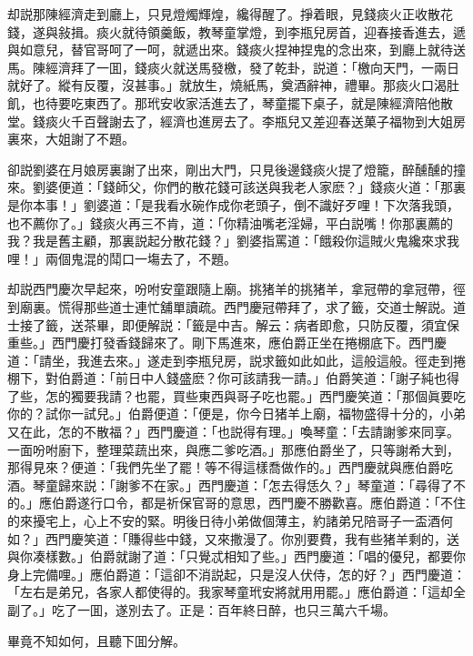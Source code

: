 却説那陳經濟走到廳上，只見燈燭輝煌，纔得醒了。掙着眼，見錢痰火正收散花錢，遂與敍揖。痰火就待領羹飯，教琴童掌燈，到李瓶兒房首，迎春接香進去，遞與如意兒，替官哥呵了一呵，就遞出來。錢痰火捏神捏鬼的念出來，到廳上就待送馬。陳經濟拜了一囬，錢痰火就送馬發檄，發了乾卦，説道：「檄向天門，一兩日就好了。縱有反覆，沒甚事。」就放生，燒紙馬，奠酒辭神，禮畢。那痰火口渴肚飢，也待要吃東西了。那玳安收家活進去了，琴童擺下桌子，就是陳經濟陪他散堂。錢痰火千百聲謝去了，經濟也進房去了。李瓶兒又差迎春送菓子福物到大姐房裏來，大姐謝了不題。

卻説劉婆在月娘房裏謝了出來，剛出大門，只見後邊錢痰火提了燈籠，醉醺醺的撞來。劉婆便道：「錢師父，你們的散花錢可該送與我老人家麽？」錢痰火道：「那裏是你本事！」劉婆道：「是我看水碗作成你老頭子，倒不識好歹哩！下次落我頭，也不薦你了。」錢痰火再三不肯，道：「你精油嘴老淫婦，平白説嘴！你那裏薦的我？我是舊主顧，那裏説起分散花錢？」劉婆指罵道：「餓殺你這賊火鬼纔來求我哩！」兩個鬼混的鬦口一塲去了，不題。

却説西門慶次早起來，吩咐安童跟隨上廟。挑猪羊的挑猪羊，拿冠帶的拿冠帶，徑到廟裏。慌得那些道士連忙舖單讀疏。西門慶冠帶拜了，求了籤，交道士解説。道士接了籤，送茶畢，即便解説：「籤是中吉。解云：病者即愈，只防反覆，須宜保重些。」西門慶打發香錢歸來了。剛下馬進來，應伯爵正坐在捲棚底下。西門慶道：「請坐，我進去來。」遂走到李瓶兒房，説求籤如此如此，這般這般。徑走到捲棚下，對伯爵道：「前日中人錢盛麽？你可該請我一請。」伯爵笑道：「謝子純也得了些，怎的獨要我請？也罷，買些東西與哥子吃也罷。」西門慶笑道：「那個眞要吃你的？試你一試兒。」伯爵便道：「便是，你今日猪羊上廟，福物盛得十分的，小弟又在此，怎的不散福？」西門慶道：「也説得有理。」喚琴童：「去請謝爹來同享。一面吩咐廚下，整理菜蔬出來，與應二爹吃酒。」那應伯爵坐了，只等謝希大到，那得見來？便道：「我們先坐了罷！等不得這樣喬做作的。」西門慶就與應伯爵吃酒。琴童歸來説：「謝爹不在家。」西門慶道：「怎去得恁久？」琴童道：「尋得了不的。」應伯爵遂行口令，都是祈保官哥的意思，西門慶不勝歡喜。應伯爵道：「不住的來擾宅上，心上不安的緊。明後日待小弟做個薄主，約諸弟兄陪哥子一盃酒何如？」西門慶笑道：「賺得些中錢，又來撒漫了。你別要費，我有些猪羊剩的，送與你凑樣數。」伯爵就謝了道：「只覺忒相知了些。」西門慶道：「唱的優兒，都要你身上完備哩。」應伯爵道：「這卻不消説起，只是沒人伏侍，怎的好？」西門慶道：「左右是弟兄，各家人都使得的。我家琴童玳安將就用用罷。」應伯爵道：「這却全副了。」吃了一囬，遂別去了。正是：百年終日醉，也只三萬六千場。

畢竟不知如何，且聽下囬分解。

